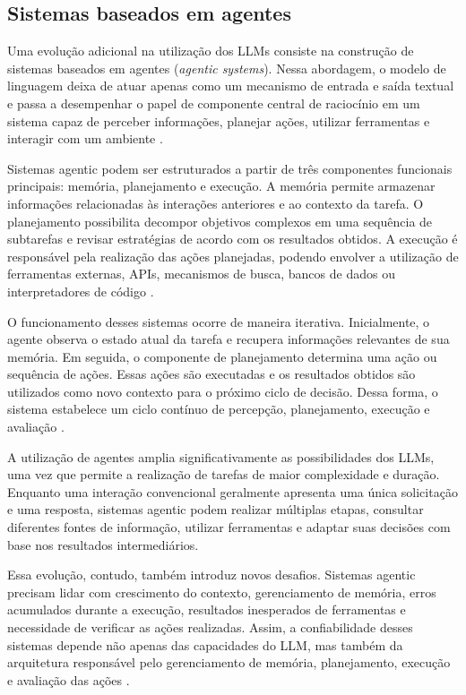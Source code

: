 \subsection{Sistemas baseados em agentes}
\label{subsec:agentic}

Uma evolução adicional na utilização dos LLMs consiste na construção de sistemas baseados em agentes (\textit{agentic systems}). Nessa abordagem, o modelo de linguagem deixa de atuar apenas como um mecanismo de entrada e saída textual e passa a desempenhar o papel de componente central de raciocínio em um sistema capaz de perceber informações, planejar ações, utilizar ferramentas e interagir com um ambiente \cite{zhao2023survey}.

Sistemas agentic podem ser estruturados a partir de três componentes funcionais principais: memória, planejamento e execução. A memória permite armazenar informações relacionadas às interações anteriores e ao contexto da tarefa. O planejamento possibilita decompor objetivos complexos em uma sequência de subtarefas e revisar estratégias de acordo com os resultados obtidos. A execução é responsável pela realização das ações planejadas, podendo envolver a utilização de ferramentas externas, APIs, mecanismos de busca, bancos de dados ou interpretadores de código \cite{zhao2023survey}.

O funcionamento desses sistemas ocorre de maneira iterativa. Inicialmente, o agente observa o estado atual da tarefa e recupera informações relevantes de sua memória. Em seguida, o componente de planejamento determina uma ação ou sequência de ações. Essas ações são executadas e os resultados obtidos são utilizados como novo contexto para o próximo ciclo de decisão. Dessa forma, o sistema estabelece um ciclo contínuo de percepção, planejamento, execução e avaliação \cite{zhao2023survey}.

A utilização de agentes amplia significativamente as possibilidades dos LLMs, uma vez que permite a realização de tarefas de maior complexidade e duração. Enquanto uma interação convencional geralmente apresenta uma única solicitação e uma resposta, sistemas agentic podem realizar múltiplas etapas, consultar diferentes fontes de informação, utilizar ferramentas e adaptar suas decisões com base nos resultados intermediários.

Essa evolução, contudo, também introduz novos desafios. Sistemas agentic precisam lidar com crescimento do contexto, gerenciamento de memória, erros acumulados durante a execução, resultados inesperados de ferramentas e necessidade de verificar as ações realizadas. Assim, a confiabilidade desses sistemas depende não apenas das capacidades do LLM, mas também da arquitetura responsável pelo gerenciamento de memória, planejamento, execução e avaliação das ações \cite{zhao2023survey}.

